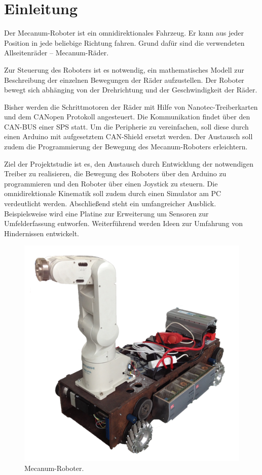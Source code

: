 
\section{Einleitung}

Der Mecanum-Roboter ist ein omnidirektionales Fahrzeug. Er kann aus jeder Position in jede beliebige Richtung fahren. Grund dafür sind die verwendeten Allseitenräder -- Mecanum-Räder. 

Zur Steuerung des Roboters ist es notwendig, ein mathematisches Modell zur Beschreibung der einzelnen Bewegungen der Räder aufzustellen.
Der Roboter bewegt sich abhänging von der Drehrichtung und der Geschwindigkeit der Räder.

Bisher werden die Schrittmotoren der Räder mit Hilfe von Nanotec-Treiberkarten und dem CANopen Protokoll angesteuert. Die Kommunikation findet über den CAN-BUS einer SPS statt. Um die Peripherie zu vereinfachen, soll diese durch einen Arduino mit aufgesetztem CAN-Shield ersetzt werden. Der Austausch soll zudem die Programmierung der Bewegung des Mecanum-Roboters erleichtern.

Ziel der Projektstudie ist es, den Austausch durch Entwicklung der notwendigen Treiber zu realisieren, die Bewegung des Roboters über den Arduino zu programmieren und den Roboter über einen Joystick zu steuern. Die omnidirektionale Kinematik soll zudem durch einen Simulator am PC verdeutlicht werden. Abschließend steht ein umfangreicher Ausblick. Beispielsweise wird eine Platine zur Erweiterung um Sensoren zur Umfelderfassung entworfen. Weiterführend werden Ideen zur Umfahrung von Hindernissen entwickelt.

\newpage
\begin{figure}[H]
\centering
 \includegraphics[width=.6\textwidth]{Abbildungen/Roboter} 
\caption[Mecanum-Roboter]{Mecanum-Roboter.}
\label{fig:Roboter}
\end{figure}

